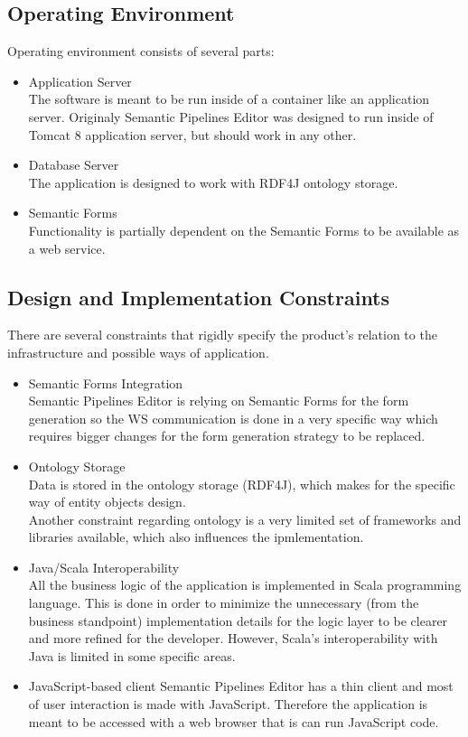 \documentclass{article}
\begin{document}
\subsection{Operating Environment}
Operating environment consists of several parts:
\begin{itemize}
    \item Application Server\\
	The software is meant to be run inside of a container like an application server. Originaly Semantic Pipelines Editor was designed to run inside of Tomcat 8 application server, but should work in any other.
    \item Database Server\\
	The application is designed to work with RDF4J ontology storage.
    \item Semantic Forms\\
	Functionality is partially dependent on the Semantic Forms to be available as a web service.
\end{itemize}
\subsection{Design and Implementation Constraints}
There are several constraints that rigidly specify the product's relation to the infrastructure and possible ways of application.
\begin{itemize}
    \item Semantic Forms Integration\\
	Semantic Pipelines Editor is relying on Semantic Forms for the form generation so the WS communication is done in a very specific way which requires bigger changes for the form generation strategy to be replaced.
    \item Ontology Storage\\
	Data is stored in the ontology storage (RDF4J), which makes for the specific way of entity objects design.\\
	Another constraint regarding ontology is a very limited set of frameworks and libraries available, which also influences the ipmlementation.
    \item Java/Scala Interoperability\\
	All the business logic of the application is implemented in Scala programming language. This is done in order to minimize the unnecessary (from the business standpoint) implementation details for the logic layer to be clearer and more refined for the developer. However, Scala's interoperability with Java is limited in some specific areas.\\
    \item JavaScript-based client
	Semantic Pipelines Editor has a thin client and most of user interaction is made with JavaScript. Therefore the application is meant to be accessed with a web browser that is can run JavaScript code.
\end{itemize}
\end{document}
